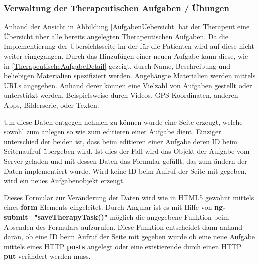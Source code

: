 \subsubsection{Verwaltung der Therapeutischen Aufgaben / Übungen}\label{_ImpTCAufgaben}

Anhand der Ansicht in Abbildung \ref{AufgabenUebersicht} hat der Therapeut eine Übersicht über alle bereits angelegten Therapeutischen Aufgaben. Da die Implementierung der Übersichtsseite im der für die Patienten wird auf diese nicht weiter eingegangen. Durch das Hinzufügen einer neuen Aufgabe kann diese, wie in \ref{TherapeutischeAufgabeDetail} gezeigt, durch Name, Beschreibung und beliebigen Materialien spezifiziert werden. Angehängte Materialien werden mittels URLs angegeben. Anhand derer können eine Vielzahl von Aufgaben gestellt oder unterstützt werden. Beispielsweise durch Videos, GPS Koordinaten, anderen Apps, Bilderserie, oder Texten.

Um diese Daten entgegen nehmen zu können wurde eine Seite erzeugt, welche sowohl zum anlegen so wie zum editieren einer Aufgabe dient. Einziger unterschied der beiden ist, dass beim editieren einer Aufgabe deren ID beim Seitenaufruf übergeben wird. Ist dies der Fall wird das Objekt der Aufgabe vom Server geladen und mit dessen Daten das Formular gefüllt, das zum ändern der Daten implementiert wurde. Wird keine ID beim Aufruf der Seite mit gegeben, wird ein neues Aufgabenobjekt erzeugt.

Dieses Formular zur Veränderung der Daten wird wie in HTML5 gewohnt mittels eines \textbf{form} Elements eingeleitet. Durch Angular ist es mit Hilfe von \textbf{ng-submit="saveTherapyTask()"} möglich die angegebene Funktion beim Absenden des Formulars aufzurufen. Diese Funktion entscheidet dann anhand daran, ob eine ID beim Aufruf der Seite mit gegeben wurde ob eine neue Aufgabe mittels eines HTTP \textbf{posts} angelegt oder eine existierende durch einen HTTP \textbf{put} verändert werden muss.

